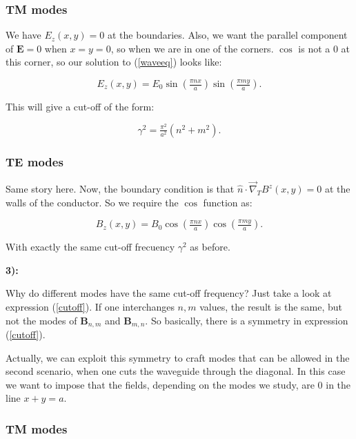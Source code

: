 \subsubsection*{TM modes}

We have $E_{z}(x,y) =0$ at the boundaries. Also, we want the parallel component of $\mathbf{E} =0$ when $x=y=0$, so when we are in one of the corners. $\cos$ is not a 0 at this corner, so our solution to (\ref{waveeq}) looks like:

\begin{equation}
	E_{z} (x,y) = E_{0}\sin\left(\tfrac{\pi n x}{a}\right) \sin\left(\tfrac{\pi m y}{a}\right).
\end{equation}

This will give a cut-off of the form:

\begin{equation}\label{cutoff}
	\gamma^{2} = \tfrac{\pi^{2}}{a^{2}}\left(n^{2}+m^{2}\right).
\end{equation}

\subsubsection*{TE modes}

Same story here. Now, the boundary condition is that $\hat{n}\cdot \vec{\nabla}_{T}B^{z}(x,y) =0$ at the walls of the conductor. So we require the $\cos$ function as:

\begin{equation}
	B_{z}(x,y) = B_{0} \cos\left(\tfrac{\pi n x}{a}\right)\cos\left(\tfrac{\pi m y}{a}\right).
\end{equation}

With exactly the same cut-off frecuency $\gamma^{2}$ as before.

\textbf{3):}

Why do different modes have the same cut-off frequency? Just take a look at expression (\ref{cutoff}). If one interchanges $n,m$ values, the result is the same, but not the modes of $\mathbf{B}_{n,m}$ and $\mathbf{B}_{m,n}$. So basically, there is a symmetry in expression (\ref{cutoff}).

Actually, we can exploit this symmetry to craft modes that can be allowed in the second scenario, when one cuts the waveguide through the diagonal. In this case we want to impose that the fields, depending on the modes we study, are 0 in the line $x+y =a$.

\subsubsection*{TM modes}

